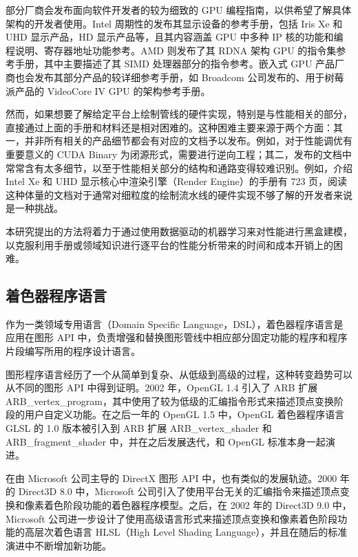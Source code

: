 
部分厂商会发布面向软件开发者的较为细致的 GPU 编程指南，以供希望了解具体架构的开发者使用。Intel 周期性的发布其显示设备的参考手册，包括 Iris Xe 和 UHD 显示产品，HD 显示产品等\cite{IntelGPUManual}，且其内容涵盖 GPU 中多种 IP 核的功能和编程说明、寄存器地址功能参考。AMD 则发布了其 RDNA 架构 GPU 的指令集参考手册\cite{AMDRDNAISA}，其中主要描述了其 SIMD 处理器部分的指令参考。嵌入式 GPU 产品厂商也会发布其部分产品的较详细参考手册，如 Broadcom 公司发布的、用于树莓派产品的 VideoCore IV GPU 的架构参考手册\cite{V3DManual}。

然而，如果想要了解给定平台上绘制管线的硬件实现，特别是与性能相关的部分，直接通过上面的手册和材料还是相对困难的。这种困难主要来源于两个方面：其一，并非所有相关的产品细节都会有对应的文档予以发布。例如，对于性能调优有重要意义的 CUDA Binary 为闭源形式，需要进行逆向工程\cite{DecodingCUDABinary}；其二，发布的文档中常常含有太多细节，以至于性能相关部分的结构和通路变得较难识别。例如，介绍 Intel Xe 和 UHD 显示核心中渲染引擎（Render Engine）的手册有 723 页，阅读这种体量的文档对于通常对细粒度的绘制流水线的硬件实现不够了解的开发者来说是一种挑战。

本研究提出的方法将着力于通过使用数据驱动的机器学习来对性能进行黑盒建模，以克服利用手册或领域知识进行逐平台的性能分析带来的时间和成本开销上的困难。

\subsection{着色器程序语言}

作为一类领域专用语言（Domain Specific Language，DSL），着色器程序语言是应用在图形 API 中，负责增强和替换图形管线中相应部分固定功能的程序和程序片段编写所用的程序设计语言。


图形程序语言经历了一个从简单到复杂、从低级到高级的过程，这种转变趋势可以从不同的图形 API 中得到证明。2002 年，OpenGL 1.4 引入了 ARB 扩展 ARB\_vertex\_program，其中使用了较为低级的汇编指令形式来描述顶点变换阶段的用户自定义功能。在之后一年的 OpenGL 1.5 中，OpenGL 着色器程序语言 GLSL 的 1.0 版本被引入到 ARB 扩展 ARB\_vertex\_shader 和 ARB\_fragment\_shader 中，并在之后发展迭代，和 OpenGL 标准本身一起演进。

在由 Microsoft 公司主导的 DirectX 图形 API 中，也有类似的发展轨迹。2000 年的 Direct3D 8.0 中，Microsoft 公司引入了使用平台无关的汇编指令来描述顶点变换和像素着色阶段功能的着色器程序模型。之后，在 2002 年的 Direct3D 9.0 中，Microsoft 公司进一步设计了使用高级语言形式来描述顶点变换和像素着色阶段功能的高层次着色语言 HLSL（High Level Shading Language），并且在随后的标准演进中不断增加新功能。

